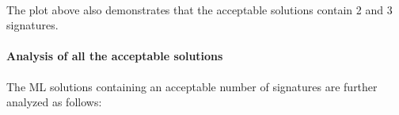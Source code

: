 \documentclass[11pt]{article}
\begin{document}
    \begin{center}
    \end{center}
    { \hspace*{\fill} \\}
    
    \begin{Verbatim}[commandchars=\\\{\}]

    \end{Verbatim}

    The plot above also demonstrates that the acceptable solutions contain 2
and 3 signatures.

\hypertarget{analysis-of-all-the-acceptable-solutions}{%
\paragraph{Analysis of all the acceptable
solutions}\label{analysis-of-all-the-acceptable-solutions}}

The ML solutions containing an acceptable number of signatures are
further analyzed as follows:
\end{document}
